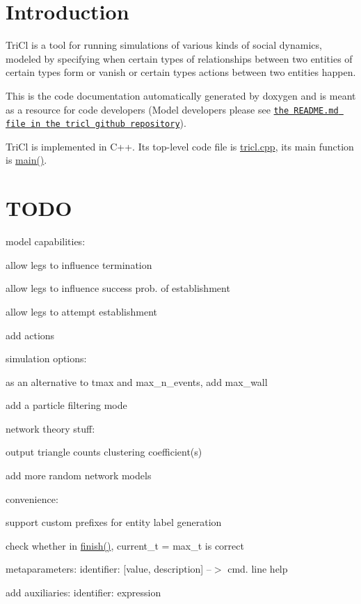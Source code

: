 \section*{Introduction }

Tri\+Cl is a tool for running simulations of various kinds of social dynamics, modeled by specifying when certain types of relationships between two entities of certain types form or vanish or certain types actions between two entities happen.

This is the code documentation automatically generated by doxygen and is meant as a resource for code developers (Model developers please see \href{https://github.com/mensch72/tricl}{\tt the R\+E\+A\+D\+M\+E.\+md file in the tricl github repository}).

Tri\+Cl is implemented in C++. Its top-\/level code file is \hyperlink{tricl_8cpp}{tricl.\+cpp}, its main function is \hyperlink{tricl_8cpp_a0ddf1224851353fc92bfbff6f499fa97}{main()}.

\section*{T\+O\+DO }

model capabilities\+:
\begin{DoxyItemize}
\item allow legs to influence termination
\item allow legs to influence success prob. of establishment
\item allow legs to attempt establishment
\item add actions
\end{DoxyItemize}

simulation options\+:
\begin{DoxyItemize}
\item as an alternative to tmax and max\+\_\+n\+\_\+events, add max\+\_\+wall
\item add a particle filtering mode
\end{DoxyItemize}

network theory stuff\+:
\begin{DoxyItemize}
\item output triangle counts clustering coefficient(s)
\item add more random network models
\end{DoxyItemize}

convenience\+:
\begin{DoxyItemize}
\item support custom prefixes for entity label generation
\item check whether in \hyperlink{finish_8cpp_a6dfe1abe0d1eb3ddc1ca081de98b5342}{finish()}, current\+\_\+t = max\+\_\+t is correct
\item metaparameters\+: identifier\+: \mbox{[}value, description\mbox{]} --$>$ cmd. line help
\item add auxiliaries\+: identifier\+: expression
\end{DoxyItemize}

